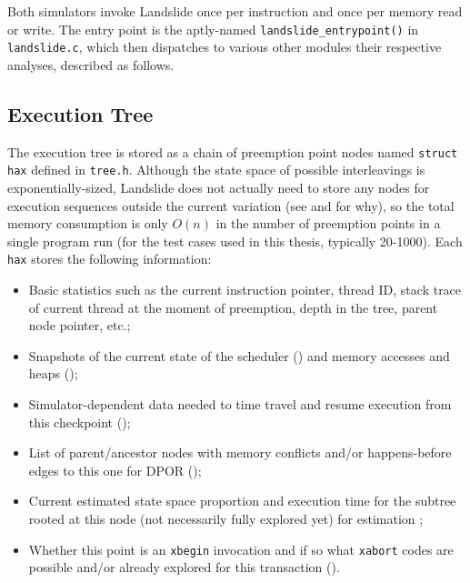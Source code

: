 Both simulators invoke Landslide once per instruction and once per memory read or write.
The entry point is the aptly-named {\tt landslide\_entrypoint()} in {\tt landslide.c},
which then dispatches to various other modules their respective analyses, described as follows.


\subsection{Execution Tree}
\label{sec:landslide-save}

The execution tree
is stored as a chain of preemption point nodes named {\tt struct hax} defined in {\tt tree.h}.
Although the state space of possible interleavings is exponentially-sized,
Landslide does not actually need to store any nodes for execution sequences outside the current variation
(see \sect{\ref{sec:landslide-estimate}} and \sect{\ref{sec:landslide-dpor}} for why),
so the total memory consumption is only $O(n)$ in the number of preemption points in a single program run
(for the test cases used in this thesis, typically 20-1000).
Each {\tt hax} stores the following information:

\begin{itemize}
	\item Basic statistics such as the current instruction pointer, thread ID,
		stack trace of current thread at the moment of preemption,
		depth in the tree, parent node pointer, etc.;
	\item Snapshots of the current state of the scheduler (\sect{\ref{sec:landslide-scheduler}})
		and memory accesses and heaps (\sect{\ref{sec:landslide-memory}});
	\item Simulator-dependent data needed to time travel and resume execution
		from this checkpoint (\sect{\ref{sec:landslide-timetravel}});
	\item List of parent/ancestor nodes with memory conflicts and/or happens-before edges to this one
		for DPOR (\sect{\ref{sec:landslide-dpor}});
	\item Current estimated state space proportion and execution time for the subtree rooted at this node
		(not necessarily fully explored yet) for estimation \sect{\ref{sec:landslide-estimate}};
	\item Whether this point is an {\tt xbegin} invocation
		and if so what {\tt xabort} codes are possible and/or already explored for this transaction
		(\sect{\ref{chap:tm}}).
\end{itemize}

